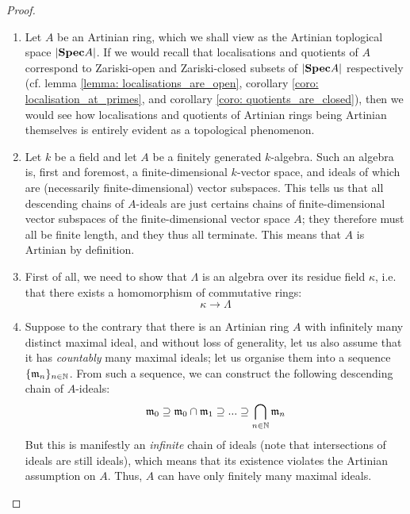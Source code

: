                     \begin{proof}
                        \noindent
                        \begin{enumerate}
                            \item Let $A$ be an Artinian ring, which we shall view as the Artinian toplogical space $|\mathbf{Spec} A|$. If we would recall that localisations and quotients of $A$ correspond to Zariski-open and Zariski-closed subsets of $|\mathbf{Spec} A|$ respectively (cf. lemma \ref{lemma: localisations_are_open}, corollary \ref{coro: localisation_at_primes}, and corollary \ref{coro: quotients_are_closed}), then we would see how localisations and quotients of Artinian rings being Artinian themselves is entirely evident as a topological phenomenon. 
                            \item Let $k$ be a field and let $A$ be a finitely generated $k$-algebra. Such an algebra is, first and foremost, a finite-dimensional $k$-vector space, and ideals of which are (necessarily finite-dimensional) vector subspaces. This tells us that all descending chains of $A$-ideals are just certains chains of finite-dimensional vector subspaces of the finite-dimensional vector space $A$; they therefore must all be finite length, and they thus all terminate. This means that $A$ is Artinian by definition.
                            \item First of all, we need to show that $\Lambda$ is an algebra over its residue field $\kappa$, i.e. that there exists a homomorphism of commutative rings:
                                $$\kappa \to \Lambda$$
                            
                            \item Suppose to the contrary that there is an Artinian ring $A$ with infinitely many distinct maximal ideal, and without loss of generality, let us also assume that it has \textit{countably} many maximal ideals; let us organise them into a sequence $\{\mathfrak{m}_n\}_{n \in \mathbb{N}}$. From such a sequence, we can construct the following descending chain of $A$-ideals:
                                $$\mathfrak{m}_0 \supseteq \mathfrak{m}_0 \cap \mathfrak{m}_1 \supseteq ... \supseteq \bigcap_{n \in \mathbb{N}} \mathfrak{m}_n$$
                            But this is manifestly an \textit{infinite} chain of ideals (note that intersections of ideals are still ideals), which means that its existence violates the Artinian assumption on $A$. Thus, $A$ can have only finitely many maximal ideals.
                            

\end{enumerate}
\end{proof}
